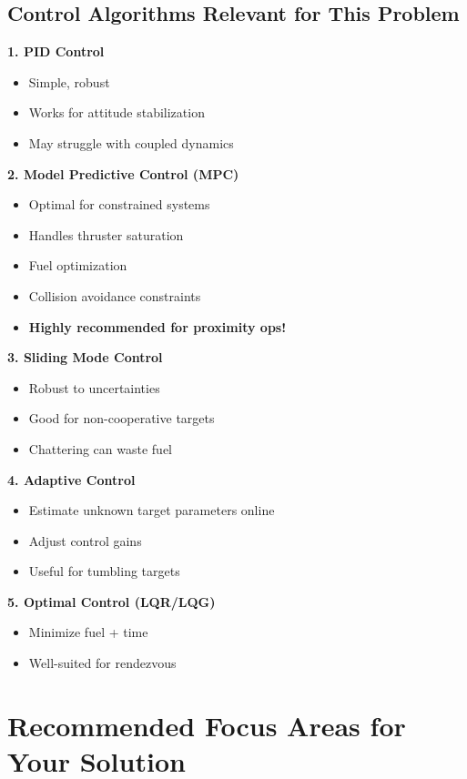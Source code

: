 \documentclass[11pt,a4paper]{article}
\begin{document}
\subsection{Control Algorithms Relevant for This Problem}

\textbf{1. PID Control}
\begin{itemize}[leftmargin=*]
    \item Simple, robust
    \item Works for attitude stabilization
    \item May struggle with coupled dynamics
\end{itemize}

\textbf{2. Model Predictive Control (MPC)}
\begin{itemize}[leftmargin=*]
    \item Optimal for constrained systems
    \item Handles thruster saturation
    \item Fuel optimization
    \item Collision avoidance constraints
    \item \textbf{Highly recommended for proximity ops!}
\end{itemize}

\textbf{3. Sliding Mode Control}
\begin{itemize}[leftmargin=*]
    \item Robust to uncertainties
    \item Good for non-cooperative targets
    \item Chattering can waste fuel
\end{itemize}

\textbf{4. Adaptive Control}
\begin{itemize}[leftmargin=*]
    \item Estimate unknown target parameters online
    \item Adjust control gains
    \item Useful for tumbling targets
\end{itemize}

\textbf{5. Optimal Control (LQR/LQG)}
\begin{itemize}[leftmargin=*]
    \item Minimize fuel + time
    \item Well-suited for rendezvous
\end{itemize}

\section{Recommended Focus Areas for Your Solution}
\end{document}
